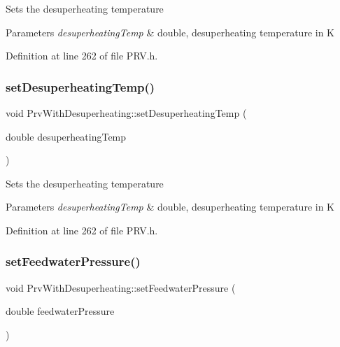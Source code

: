 Sets the desuperheating temperature


\begin{DoxyParams}{Parameters}
{\em desuperheating\+Temp} & double, desuperheating temperature in K \\
\hline
\end{DoxyParams}


Definition at line 262 of file P\+R\+V.\+h.

\mbox{\label{class_prv_with_desuperheating_ade1b153c495efb451006b3c054ff386e}} 
\subsubsection{\texorpdfstring{set\+Desuperheating\+Temp()}{setDesuperheatingTemp()}\hspace{0.1cm}{\footnotesize\ttfamily [3/3]}}
{\footnotesize\ttfamily void Prv\+With\+Desuperheating\+::set\+Desuperheating\+Temp (\begin{DoxyParamCaption}\item[{double}]{desuperheating\+Temp }\end{DoxyParamCaption})\hspace{0.3cm}{\ttfamily [inline]}}

Sets the desuperheating temperature


\begin{DoxyParams}{Parameters}
{\em desuperheating\+Temp} & double, desuperheating temperature in K \\
\hline
\end{DoxyParams}


Definition at line 262 of file P\+R\+V.\+h.

\mbox{\label{class_prv_with_desuperheating_a8494ebf87e5bd834f621b0c7ca257fbe}} 
\subsubsection{\texorpdfstring{set\+Feedwater\+Pressure()}{setFeedwaterPressure()}\hspace{0.1cm}{\footnotesize\ttfamily [1/3]}}
{\footnotesize\ttfamily void Prv\+With\+Desuperheating\+::set\+Feedwater\+Pressure (\begin{DoxyParamCaption}\item[{double}]{feedwater\+Pressure }\end{DoxyParamCaption})\hspace{0.3cm}{\ttfamily [inline]}}

